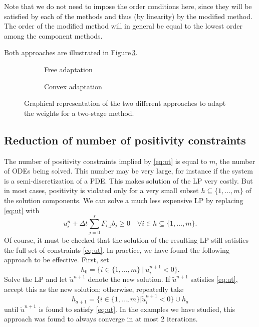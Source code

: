 \documentclass[a4paper]{article}
\numberwithin{equation}{section}
\theoremstyle{plain}
\theoremstyle{definition}
\numberwithin{theorem}{section}
\newcommand{\dt}{{\Delta t}}
\newcommand{\1}{\mathbbm{1}}
\newcommand{\ut}{\tilde{u}}
\begin{document}
Note that we do not need to impose the order conditions here, since they will be
satisfied by each of the methods and thus (by linearity) by the modified
method.  The order of the modified method will in general be equal to the lowest
order among the component methods.

Both approaches are illustrated in Figure\,\ref{fig:b_space}.

\begin{figure}
    \centering
    \begin{subfigure}[b]{0.45\textwidth}
        \centering
        
        \caption{Free adaptation}
        \label{fig:b_direct}
    \end{subfigure}
    \begin{subfigure}[b]{0.45\textwidth}
        \centering
        
        \caption{Convex adaptation}
        \label{fig:b_convex}
    \end{subfigure}
    \caption{Graphical representation of the two different approaches to adapt the weights for
    a two-stage method.}\label{fig:b_space}
\end{figure}

\subsection{Reduction of number of positivity constraints}
The number of positivity constraints implied by \eqref{eq:ut}
is equal to $m$, the number of ODEs being solved.  This number
may be very large, for instance if the system is a semi-discretization
of a PDE.  This makes solution of the LP very costly.
But in most cases, positivity is violated only for a very small subset $h \subseteq \{1, \dots, m\}$ of
the solution components.  We can solve a much less expensive LP
by replacing \eqref{eq:ut} with
\begin{equation}
u_i^n + \dt \sum_{j=0}^s F_{i,j}  b_j  \geq 0 \quad \forall i \in h \subseteq \{1,\dots,m \}.
\end{equation}
Of course, it must be checked that the solution of the resulting LP still
satisfies the full set of constraints \eqref{eq:ut}.  In practice, we
have found the following approach to be effective.
First, set
$$h_0 = \{ i \in \{1,\dots,m \} \ | \  u_i^{n+1}  < 0 \}.$$
Solve the LP and let $\ut^{n+1}$ denote the new solution.
If $\ut^{n+1}$ satisfies \eqref{eq:ut}, accept this as the new
solution; otherwise, repeatedly take
$$h_{a+1} = \{ i \in \{1,\dots,m \}|  \ut_i^{n+1}  < 0 \} \cup h_{a}$$
until $\ut^{n+1}$ is found to satisfy \eqref{eq:ut}.
In the examples we have studied, this approach was found to always converge in
at most 2 iterations.
\end{document}
